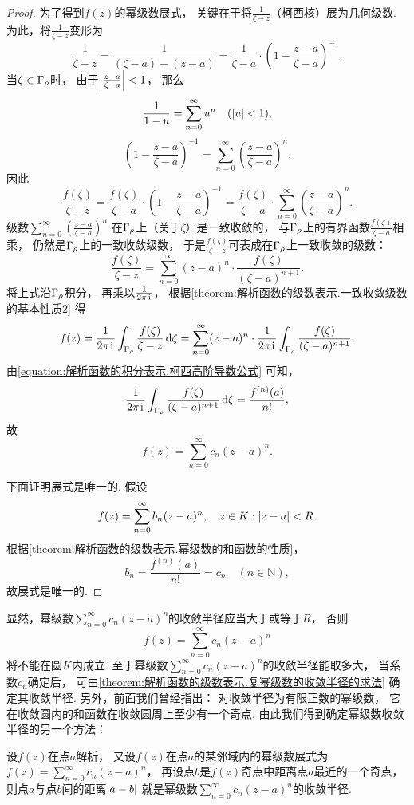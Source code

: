 \begin{theorem}
\begin{proof}
为了得到\(f(z)\)的幂级数展式，
关键在于将\(\frac{1}{\zeta-z}\)（柯西核）展为几何级数.
为此，将\(\frac{1}{\zeta-z}\)变形为\[
	\frac{1}{\zeta-z}
	= \frac{1}{(\zeta-a)-(z-a)}
	= \frac{1}{\zeta-a} \cdot \left(1 - \frac{z-a}{\zeta-a}\right)^{-1}.
\]
当\(\zeta \in \Gamma_\rho\)时，
由于\(\abs{\frac{z-a}{\zeta-a}}<1\)，
那么\[
	\frac{1}{1-u} = \sum_{n=0}^\infty u^n
	\quad(\abs{u}<1),
\]\[
	\left(1 - \frac{z-a}{\zeta-a}\right)^{-1}
	= \sum_{n=0}^\infty \left(\frac{z-a}{\zeta-a}\right)^n.
\]
因此\[
	\frac{f(\zeta)}{\zeta-z}
	= \frac{f(\zeta)}{\zeta-a} \cdot \left(1 - \frac{z-a}{\zeta-a}\right)^{-1}
	= \frac{f(\zeta)}{\zeta-a} \cdot \sum_{n=0}^\infty \left(\frac{z-a}{\zeta-a}\right)^n.
\]
级数\(\sum_{n=0}^\infty \left(\frac{z-a}{\zeta-a}\right)^n\)
在\(\Gamma_\rho\)上（关于\(\zeta\)）是一致收敛的，
与\(\Gamma_\rho\)上的有界函数\(\frac{f(\zeta)}{\zeta-a}\)相乘，
仍然是\(\Gamma_\rho\)上的一致收敛级数，
于是\(\frac{f(\zeta)}{\zeta-z}\)可表成在\(\Gamma_\rho\)上一致收敛的级数：\[
	\frac{f(\zeta)}{\zeta-z}
	= \sum_{n=0}^\infty (z-a)^n \cdot \frac{f(\zeta)}{(\zeta-a)^{n+1}}.
\]
将上式沿\(\Gamma_\rho\)积分，
再乘以\(\frac{1}{2\pi\kern1pt\mathrm{i}\kern1pt}\)，
根据\cref{theorem:解析函数的级数表示.一致收敛级数的基本性质2} 得\[
	f(z) = \frac{1}{2\pi\kern1pt\mathrm{i}\kern1pt} \int_{\Gamma_\rho} \frac{f(\zeta)}{\zeta-z} \dd{\zeta}
	= \sum_{n=0}^\infty (z-a)^n \cdot \frac{1}{2\pi\kern1pt\mathrm{i}\kern1pt} \int_{\Gamma_\rho} \frac{f(\zeta)}{(\zeta-a)^{n+1}}.
\]
由\cref{equation:解析函数的积分表示.柯西高阶导数公式} 可知，\[
	\frac{1}{2\pi\kern1pt\mathrm{i}\kern1pt} \int_{\Gamma_\rho} \frac{f(\zeta)}{(\zeta-a)^{n+1}} \dd{\zeta}
	= \frac{f^{(n)}(a)}{n!},
\]
故\[
	f(z) = \sum_{n=0}^\infty c_n (z-a)^n.
\]

下面证明展式是唯一的.
假设\[
	f(z) = \sum_{n=0}^\infty b_n (z-a)^n,
	\quad z \in K: \abs{z-a}<R.
\]
根据\cref{theorem:解析函数的级数表示.幂级数的和函数的性质}，\[
	b_n = \frac{f^{(n)}(a)}{n!} = c_n \quad (n\in\mathbb{N}),
\]
故展式是唯一的.
\end{proof}
\end{theorem}
显然，幂级数\(\sum_{n=0}^\infty c_n (z-a)^n\)的收敛半径应当大于或等于\(R\)，
否则\[
	f(z) = \sum_{n=0}^\infty c_n (z-a)^n
\]将不能在圆\(K\)内成立.
至于幂级数\(\sum_{n=0}^\infty c_n (z-a)^n\)的收敛半径能取多大，
当系数\(c_n\)确定后，
可由\cref{theorem:解析函数的级数表示.复幂级数的收敛半径的求法} 确定其收敛半径.
另外，前面我们曾经指出：
对收敛半径为有限正数的幂级数，
它在收敛圆内的和函数在收敛圆周上至少有一个奇点.
由此我们得到确定幂级数收敛半径的另一个方法：

设\(f(z)\)在点\(a\)解析，
又设\(f(z)\)在点\(a\)的某邻域内的幂级数展式为
\(f(z) = \sum_{n=0}^\infty c_n (z-a)^n\)，
再设点\(b\)是\(f(z)\)奇点中距离点\(a\)最近的一个奇点，
则点\(a\)与点\(b\)间的距离\(\abs{a-b}\)
就是幂级数\(\sum_{n=0}^\infty c_n (z-a)^n\)的收敛半径.

